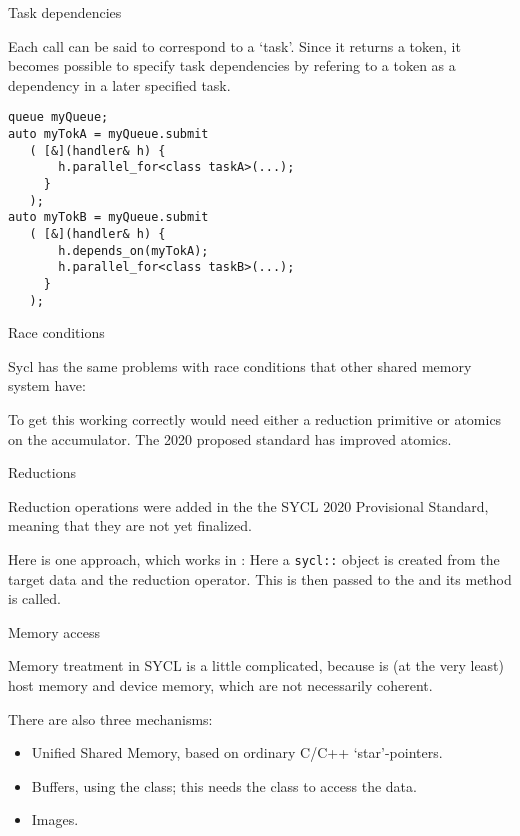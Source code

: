  {Task dependencies}

Each  call can be said to correspond to a `task'.
Since it returns a token, it becomes possible to specify
task dependencies by refering to a token as a dependency
in a later specified task.
\begin{lstlisting}
queue myQueue;
auto myTokA = myQueue.submit
   ( [&](handler& h) {
       h.parallel_for<class taskA>(...);
     }
   );
auto myTokB = myQueue.submit
   ( [&](handler& h) {
       h.depends_on(myTokA);
       h.parallel_for<class taskB>(...);
     }
   );
\end{lstlisting}

 {Race conditions}

Sycl has the same problems with race conditions that
other shared memory system have:


To get this working correctly would need either
a reduction primitive or atomics on the accumulator.
The 2020 proposed standard has improved atomics.


 {Reductions}

Reduction operations were added in the the SYCL 2020 Provisional Standard,
meaning that they are not yet finalized.

Here is one approach, which works in :
%
%
Here a \lstinline+sycl::+ object is created
from the target data and the reduction operator. 
This is then passed to the 
and its  method is called.

 {Memory access}

Memory treatment in SYCL is a little complicated, because is (at the very least)
host memory and device memory, which are not necessarily coherent.

There are also three mechanisms:
\begin{itemize}
\item Unified Shared Memory, based on ordinary C/C++ `star'-pointers.
\item Buffers, using the  class;
  this needs the  class to access the data.
\item Images.
\end{itemize}

